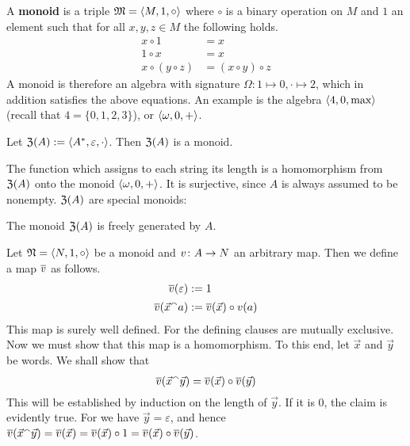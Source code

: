A \textbf{monoid} is a triple $\mathfrak{M} = \langle M, 1, \circ\rangle$
where $\circ$ is a binary operation on $M$ and $1$ an element
such that for all $x, y, z \in M$ the following holds.
\begin{subequations}
\begin{align}
x \circ 1 & = x \\
1 \circ x & = x\\
x \circ (y \circ z) & = (x \circ y) \circ z
\end{align}
\end{subequations}
A monoid is therefore an algebra with signature 
$\Omega \colon 1 \mapsto 0, \cdot \mapsto 2$, which in addition
satisfies the above equations. An example is the algebra 
$\langle 4, 0, \max\rangle$ (recall that $4 = \{0,1,2,3\}$), or 
$\langle \omega, 0, +\rangle$. 
\begin{prop}
Let $\mathfrak{Z}(A) := \langle A^{\ast}, \varepsilon, \cdot\rangle$. Then
$\mathfrak{Z}(A)$ is a monoid.
\end{prop}
The function which assigns to each string 
its length is a homomorphism from $\mathfrak{Z}(A)$ onto the monoid $\langle
\omega, 0, +\rangle$. It is surjective, since $A$ is always assumed to
be nonempty. $\mathfrak{Z}(A)$ are special monoids: 
\begin{prop}
The monoid $\mathfrak{Z}(A)$ is freely generated by $A$.
\end{prop}
\proofbeg
Let $\mathfrak{N} = \langle N, 1, \circ\rangle$ be a monoid and $v \colon A \rightarrow N$ an
arbitrary map. Then we define a map $\overline{v}$ as follows.
\begin{equation}
\begin{split}
\overline{v}(\varepsilon) & := 1 \\
\overline{v}(\vec{x} {^{\smallfrown}} a) & := \overline{v}(\vec{x}) \circ v(a)
\end{split}
\end{equation}
This map is surely well defined. For the defining clauses are mutually
exclusive. Now we must show that this map is a
homomorphism. To this end, let $\vec{x}$ and $\vec{y}$ be words.
We shall show that
\begin{equation}
\overline{v}(\vec{x} {^{\smallfrown}} \vec{y}) = \overline{v}(\vec{x}) \circ
    \overline{v}(\vec{y}) 
\end{equation}
This will be established by induction on the length of $\vec{y}$.
If it is 0, the claim is evidently true. For we have $\vec{y} =
\varepsilon$, and hence $\overline{v}(\vec{x} {^{\smallfrown}} \vec{y}) =
    \overline{v}(\vec{x}) = \overline{v}(\vec{x}) \circ 1 =
    \overline{v}(\vec{x}) \circ \overline{v}(\vec{y})$.
